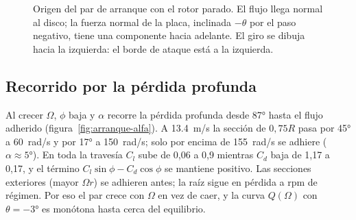 \begin{figure}[H]
\centering
{}
\caption{Origen del par de arranque con el rotor parado. El flujo llega normal al disco; la
fuerza normal de la placa, inclinada $-\theta$ por el paso negativo, tiene una componente
hacia adelante. El giro se dibuja hacia la izquierda: el borde de ataque está a la izquierda.}
\label{fig:arranque-triangulo}
\end{figure}

\subsection{Recorrido por la pérdida profunda}

Al crecer $\Omega$, $\phi$ baja y $\alpha$ recorre la pérdida profunda desde \ang{87}
hasta el flujo adherido (figura~\ref{fig:arranque-alfa}). A \SI{13.4}{m/s} la sección de
$0{,}75R$ pasa por \ang{45} a \SI{60}{rad/s} y por \ang{17} a \SI{150}{rad/s}; solo por
encima de \SI{155}{rad/s} se adhiere ($\alpha\approx\ang{5}$). En toda la travesía $C_l$
sube de 0,06 a 0,9 mientras $C_d$ baja de 1,17 a 0,17, y el término
$C_l\sin\phi-C_d\cos\phi$ se mantiene positivo. Las secciones exteriores (mayor $\Omega r$)
se adhieren antes; la raíz sigue en pérdida a rpm de régimen. Por eso el par crece con
$\Omega$ en vez de caer, y la curva $Q(\Omega)$ con $\theta=\ang{-3}$ es monótona hasta
cerca del equilibrio.

